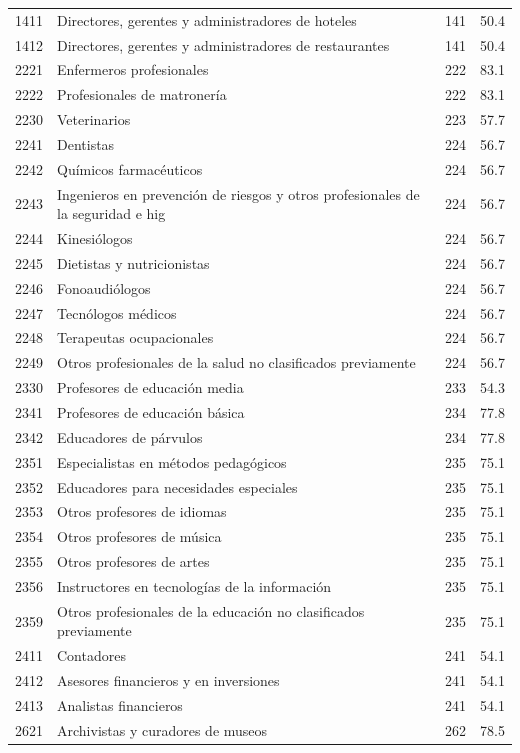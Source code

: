 \begin{longtable}{@{}c p{} c r@{}}
1411 & Directores, gerentes y administradores de hoteles & 141 & 50.4 \\
1412 & Directores, gerentes y administradores de restaurantes & 141 & 50.4 \\
2221 & Enfermeros profesionales & 222 & 83.1 \\
2222 & Profesionales de matronería & 222 & 83.1 \\
2230 & Veterinarios & 223 & 57.7 \\
2241 & Dentistas & 224 & 56.7 \\
2242 & Químicos farmacéuticos & 224 & 56.7 \\
2243 & Ingenieros en prevención de riesgos y otros profesionales de la seguridad e hig & 224 & 56.7 \\
2244 & Kinesiólogos & 224 & 56.7 \\
2245 & Dietistas y nutricionistas & 224 & 56.7 \\
2246 & Fonoaudiólogos & 224 & 56.7 \\
2247 & Tecnólogos médicos & 224 & 56.7 \\
2248 & Terapeutas ocupacionales & 224 & 56.7 \\
2249 & Otros profesionales de la salud no clasificados previamente & 224 & 56.7 \\
2330 & Profesores de educación media & 233 & 54.3 \\
2341 & Profesores de educación básica & 234 & 77.8 \\
2342 & Educadores de párvulos & 234 & 77.8 \\
2351 & Especialistas en métodos pedagógicos & 235 & 75.1 \\
2352 & Educadores para necesidades especiales & 235 & 75.1 \\
2353 & Otros profesores de idiomas & 235 & 75.1 \\
2354 & Otros profesores de música & 235 & 75.1 \\
2355 & Otros profesores de artes & 235 & 75.1 \\
2356 & Instructores en tecnologías de la información & 235 & 75.1 \\
2359 & Otros profesionales de la educación no clasificados previamente & 235 & 75.1 \\
2411 & Contadores & 241 & 54.1 \\
2412 & Asesores financieros y en inversiones & 241 & 54.1 \\
2413 & Analistas financieros & 241 & 54.1 \\
2621 & Archivistas y curadores de museos & 262 & 78.5 \\

\end{longtable}
